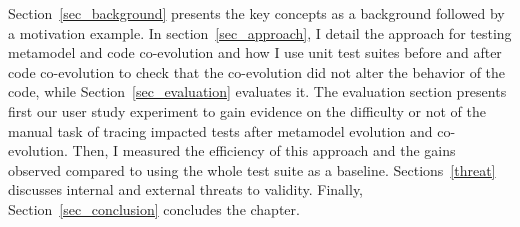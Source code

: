 Section~\ref{sec_background} presents the key concepts as a background followed by a motivation example. 
In section~\ref{sec_approach}, I detail the approach for testing metamodel and code co-evolution and how I use unit test suites before and after code co-evolution to check that the co-evolution did not alter the behavior of the code, while Section~\ref{sec_evaluation} evaluates it. The evaluation section presents first our user study experiment to gain evidence on the difficulty or not of the manual task of tracing impacted tests after metamodel evolution and co-evolution. Then, I measured the efficiency of this approach and the gains observed compared to using the whole test suite as a baseline.
Sections~\ref{threat} discusses internal and external threats to validity. 
Finally, Section~\ref{sec_conclusion} concludes the chapter. 
%


%

